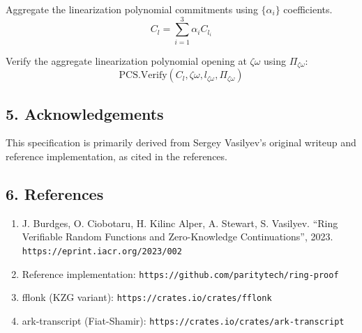 \documentclass[
]{article}
\providecommand{\tightlist}{%
  \setlength{\itemsep}{0pt}\setlength{\parskip}{0pt}}
\begin{document}
Aggregate the linearization polynomial commitments using
\(\{\alpha_i\}\) coefficients. \[C_l=\sum_{i=1}^3\alpha_iC_{l_i}\]

Verify the aggregate linearization polynomial opening at
\(\zeta \omega\) using \(\Pi_{\zeta\omega}\):
\[\text{PCS.Verify}(C_{l},\zeta\omega,l_{\zeta\omega},\Pi_{\zeta\omega})\]

\subsection{5. Acknowledgements}\label{acknowledgements}

This specification is primarily derived from Sergey Vasilyev's original
writeup and reference implementation, as cited in the references.

\subsection{6. References}\label{references}

\begin{enumerate}
\def\labelenumi{\arabic{enumi}.}
\tightlist
\item
  J. Burdges, O. Ciobotaru, H. Kilinc Alper, A. Stewart, S. Vasilyev.
  ``Ring Verifiable Random Functions and Zero-Knowledge Continuations'',
  2023. \texttt{https://eprint.iacr.org/2023/002}
\item
  Reference implementation:
  \texttt{https://github.com/paritytech/ring-proof}
\item
  fflonk (KZG variant): \texttt{https://crates.io/crates/fflonk}
\item
  ark-transcript (Fiat-Shamir):
  \texttt{https://crates.io/crates/ark-transcript}
\end{enumerate}
\end{document}
